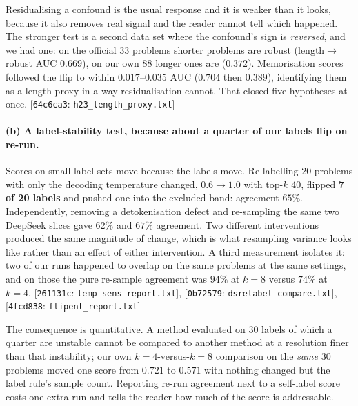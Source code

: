 \documentclass[10pt]{article}
\newcommand{\cmt}[2]{{\footnotesize\textsf{[}\texttt{#1}\textsf{:} #2\textsf{]}}}
\begin{document}
Residualising a confound is the usual response and it is weaker than it looks, because it also
removes real signal and the reader cannot tell which happened. The stronger test is a second data
set where the confound's sign is \emph{reversed}, and we had one: on the official 33 problems
shorter problems are robust (length$\to$robust AUC $0.669$), on our own 88 longer ones are
($0.372$). Memorisation scores followed the flip to within $0.017$--$0.035$ AUC ($0.704$ then
$0.389$), identifying them as a length proxy in a way residualisation cannot. That closed five
hypotheses at once. \cmt{64c6ca3}{\texttt{h23\_length\_proxy.txt}}

\paragraph{(b) A label-stability test, because about a quarter of our labels flip on re-run.} Scores
on small label sets move because the labels move. Re-labelling 20 problems with only the decoding
temperature changed, $0.6 \to 1.0$ with top-$k$ 40, flipped \textbf{7 of 20 labels} and pushed one
into the excluded band: agreement $65\%$. Independently, removing a detokenisation defect and
re-sampling the same two DeepSeek slices gave $62\%$ and $67\%$ agreement. Two different
interventions produced the same magnitude of change, which is what resampling variance looks like
rather than an effect of either intervention. A third measurement isolates it: two of our runs
happened to overlap on the same problems at the same settings, and on those the pure re-sample
agreement was $94\%$ at $k{=}8$ versus $74\%$ at $k{=}4$.
\cmt{261131c}{\texttt{temp\_sens\_report.txt}}, \cmt{0b72579}{\texttt{dsrelabel\_compare.txt}},
\cmt{4fcd838}{\texttt{flipent\_report.txt}}

The consequence is quantitative. A method evaluated on 30 labels of which a quarter are unstable
cannot be compared to another method at a resolution finer than that instability; our own
$k{=}4$-versus-$k{=}8$ comparison on the \emph{same} 30 problems moved one score from $0.721$ to
$0.571$ with nothing changed but the label rule's sample count. Reporting re-run agreement next to a
self-label score costs one extra run and tells the reader how much of the score is addressable.
\end{document}
